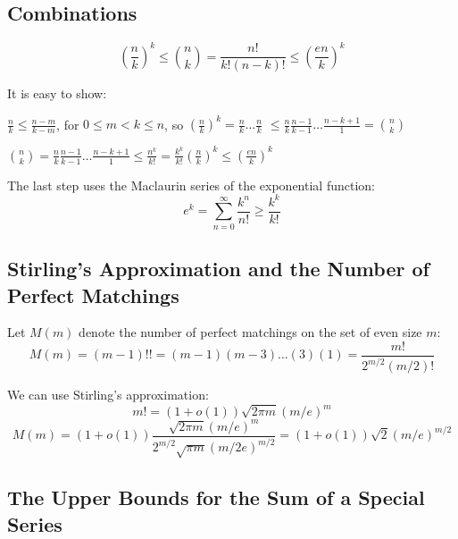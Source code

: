 \subsection{Combinations}

\begin{equation}
    \left(\frac{n}{k}\right)^k
    \leq\binom{n}{k}=\frac{n!}{k!(n-k)!}
    \leq\left(\frac{en}{k}\right)^k
\end{equation}

It is easy to show:

$\frac{n}{k}\leq\frac{n-m}{k-m}$, for $0\leq m<k\leq n$,
so $\left(\frac{n}{k}\right)^k=\frac{n}{k}\ldots\frac{n}{k}$
$\leq\frac{n}{k}\frac{n-1}{k-1}\ldots\frac{n-k+1}{1}=\binom{n}{k}$

$\binom{n}{k}=\frac{n}{k}\frac{n-1}{k-1}\ldots\frac{n-k+1}{1}
\leq\frac{n^k}{k!}=\frac{k^k}{k!}\left(\frac{n}{k}\right)^k\leq\left(\frac{en}{k}\right)^k$

The last step uses the Maclaurin series of the exponential function:
\begin{equation}
    e^k=\sum_{n=0}^{\infty}{\frac{k^n}{n!}}\geq\frac{k^k}{k!}
\end{equation}

\subsection{Stirling's Approximation and the Number of Perfect Matchings}

Let $M(m)$ denote the number of perfect matchings on the set of even size $m$:
\begin{equation}
    M(m)=(m-1)!!=(m-1)(m-3)\ldots(3)(1)=\frac{m!}{2^{m/2}(m/2)!}
\end{equation}

We can use Stirling's approximation:
\begin{equation}
    \label{eq:stirling-approx}
    m!=(1+o(1))\sqrt{2\pi m}(m/e)^m
\end{equation}
\begin{equation}
    \label{eq:number-of-matchings}
    M(m)=(1+o(1))\frac{\sqrt{2\pi m}(m/e)^m}{2^{m/2}\sqrt{\pi m}(m/2e)^{m/2}}
    =(1+o(1))\sqrt{2}(m/e)^{m/2}
\end{equation}

\subsection{The Upper Bounds for the Sum of a Special Series}

